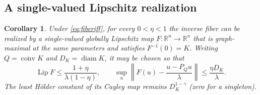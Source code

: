\documentclass[11pt]{article}
\numberwithin{equation}{section}
\newtheorem{corollary}[theorem]{Corollary}
\theoremstyle{definition}
\theoremstyle{remark}
\newcommand{\R}{\mathbb R}
\newcommand{\diam}{\operatorname{diam}}
\newcommand{\Lip}{\operatorname{Lip}}
\newcommand{\conv}{\operatorname{conv}}
\begin{document}
\subsection{A single-valued Lipschitz realization}

\begin{corollary}\label{cor:lipschitz_realization}
Under \eqref{eq:fiberiff}, for every $0<\eta<1$ the inverse fiber can
be realized by a single-valued globally Lipschitz map
$F:\R^n\to\R^n$ that is graph-maximal at the same parameters and
satisfies $F^{-1}(0)=K$. Writing $Q=\overline{\conv}K$ and
$D_K=\diam K$, it may be chosen so that
\begin{equation}\label{eq:lipschitz_realization}
 \Lip F\le\frac{1+\eta}{\lambda(1-\eta)},\qquad
 \sup_u\left\|F(u)-\frac{u-P_Qu}{\lambda}\right\|
 \le\frac{\eta D_K}{\lambda}.
\end{equation}
The least H\"older constant of its Cayley map remains
$D_K^{1-\gamma}$ (zero for a singleton).
\end{corollary}
\end{document}
